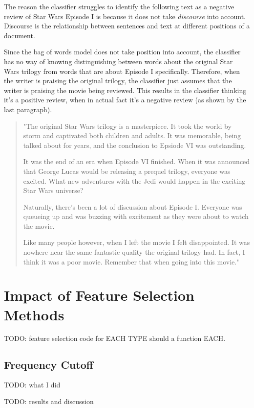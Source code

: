 \documentclass{article}
\begin{document}
The reason the classifier struggles to identify the following text as a negative review of Star Wars Episode I is because it does not take \textit{discourse} into account. Discourse is the relationship between sentences and text at different positions of a document.

Since the bag of words model does not take position into account, the classifier has no way of knowing distinguishing between words about the original Star Wars trilogy from words that are about Episode I specifically. Therefore, when the writer is praising the original trilogy, the classifier just assumes that the writer is praising the movie being reviewed. This results in the classifier thinking it's a positive review, when in actual fact it's a negative review (as shown by the last paragraph).

\begin{quote}
"The original Star Wars trilogy is a masterpiece. It took the world by storm and captivated both children and adults. It was memorable, being talked about for years, and the conclusion to Epsiode VI was outstanding.

It was the end of an era when Episode VI finished. When it was announced that George Lucas would be releasing a prequel trilogy, everyone was excited. What new adventures with the Jedi would happen in the exciting Star Wars universe?

Naturally, there's been a lot of discussion about Episode I. Everyone was queueing up and was buzzing with excitement as they were about to watch the movie.

Like many people however, when I left the movie I felt disappointed. It was nowhere near the same fantastic quality the original trilogy had. In fact, I think it was a poor movie. Remember that when going into this movie."
\end{quote}

\section{Impact of Feature Selection Methods}

TODO: feature selection code for EACH TYPE should a function EACH. 

\subsection{Frequency Cutoff}

TODO: what I did

TODO: results and discussion
\end{document}
